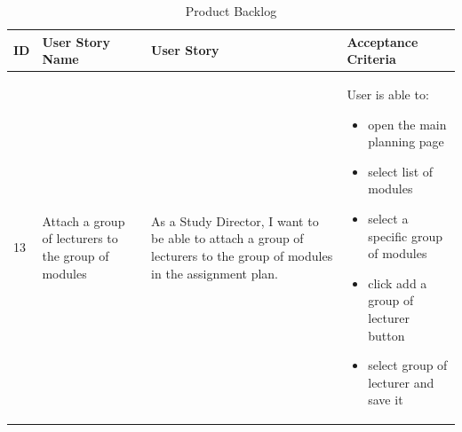 \documentclass{scrartcl}
\begin{document}
\begin{table}[H]
\begin{center}
\begin{tabular}{|p{0.5cm} |p{3cm}|p{5.5cm}|p{5.5cm}|}\hline
\rowcolor{LightCyan}
 \textbf{ ID} &\textbf{User Story Name} &\textbf{User Story}  & \textbf{Acceptance Criteria} 
 \\
\hline

13
& Attach a group of lecturers to the group of modules
& As a Study Director, I want to be able to attach a group of lecturers to the group of modules in the assignment plan. &
 
   User is able to:            
\begin{itemize}
\item open the main planning page
\item select list of modules 
\item select a specific group of modules
\item click add a group of lecturer button
\item select group of lecturer and save it


\end{itemize}                                                                
 \\ \hline
  \end{tabular}
\end{center}
\caption{Product Backlog}
\label{table2}
\end{table}

\pagebreak
\end{document}
